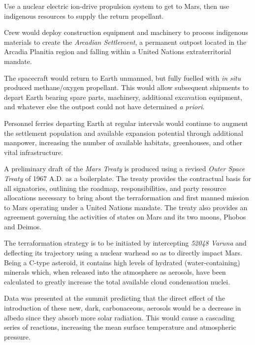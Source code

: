 \item Use a nuclear electric ion-drive propulsion system to get to Mars, then use indigenous resources to supply the return propellant.

\item Crew would deploy construction equipment and machinery to process indigenous materials to create the {\it Arcadian Settlement}, a permanent outpost located in the Arcadia Planitia region and falling within a United Nations extraterritorial mandate.

\item The spacecraft would return to Earth unmanned, but fully fuelled with {\it in situ} produced methane/oxygen propellant. This would allow subsequent shipments to depart Earth bearing spare parts, machinery, additional excavation equipment, and whatever else the outpost could not have determined {\it a priori}.

\item Personnel ferries departing Earth at regular intervals would continue to augment the settlement population and available expansion potential through additional manpower, increasing the number of available habitats, greenhouses, and other vital infrastructure.
\stopitemize

A preliminary draft of the {\it Mars Treaty} is produced using a revised {\it Outer Space Treaty} of 1967 A.D. as a boilerplate. The treaty provides the contractual basis for all signatories, outlining the roadmap, responsibilities, and party resource allocations necessary to bring about the terraformation and first manned mission to Mars operating under a United Nations mandate. The treaty also provides an agreement governing the activities of states on Mars and its two moons, Phobos and Deimos.

The terraformation strategy is to be initiated by intercepting {\it 52048 Varuna} and deflecting its trajectory using a nuclear warhead so as to directly impact Mars. Being a C-type asteroid, it contains high levels of hydrated (water-containing) minerals which, when released into the atmosphere as aerosols, have been calculated to greatly increase the total available cloud condensation nuclei.

Data was presented at the summit predicting that the direct effect of the introduction of these new, dark, carbonaceous, aerosols would be a decrease in albedo since they absorb more solar radiation. This would cause a cascading series of reactions, increasing the mean surface temperature and atmospheric pressure.

